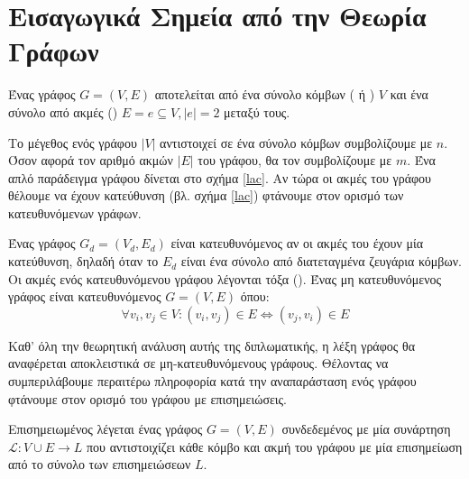 \section{Εισαγωγικά Σημεία από την Θεωρία Γράφων}
\begin{definition}[Γράφος]
Ένας γράφος $G = (V, E)$ αποτελείται από ένα σύνολο κόμβων ( ή ) $V$ και ένα σύνολο από ακμές () $ E = {e \subseteq V, |e|=2}$ μεταξύ τους.
\end{definition}
Το μέγεθος ενός γράφου $|V|$ αντιστοιχεί σε ένα σύνολο κόμβων συμβολίζουμε με $n$. Όσον αφορά τον αριθμό ακμών $|E|$ του γράφου, θα τον συμβολίζουμε με $m$. Ένα απλό παράδειγμα γράφου δίνεται στο σχήμα \ref{lac}.
Αν τώρα οι ακμές του γράφου θέλουμε να έχουν κατεύθυνση (βλ. σχήμα \ref{lac}) φτάνουμε στον ορισμό των κατευθυνόμενων γράφων.
\begin{definition}
Ένας γράφος $G_{d} = (V_{d}, E_{d})$ είναι κατευθυνόμενος αν οι ακμές του έχουν μία κατεύθυνση, δηλαδή όταν το $E_{d}$ είναι ένα σύνολο από διατεταγμένα ζευγάρια κόμβων.
Οι ακμές ενός κατευθυνόμενου γράφου λέγονται τόξα ().
Ένας μη κατευθυνόμενος γράφος είναι κατευθυνόμενος $G = ( V, E )$ όπου:
$$\forall v_{i}, v_{j} \in V: (v_{i}, v_{j}) \in E \Leftrightarrow (v_{j}, v_{i}) \in E$$
\end{definition}
Καθ' όλη την θεωρητική ανάλυση αυτής της διπλωματικής, η λέξη γράφος θα αναφέρεται αποκλειστικά σε μη-κατευθυνόμενους γράφους.
Θέλοντας να συμπεριλάβουμε περαιτέρω πληροφορία κατά την αναπαράσταση ενός γράφου φτάνουμε στον ορισμό του γράφου με επισημειώσεις.
\begin{definition}
Επισημειωμένος λέγεται ένας γράφος $G = ( V, E )$ συνδεδεμένος με μία συνάρτηση $\mathcal{L} : V \cup E \to L$ που αντιστοιχίζει κάθε κόμβο και ακμή του γράφου με μία επισημείωση από το σύνολο των επισημειώσεων $L$.
\label{def:labeled_graphs}
\end{definition}

